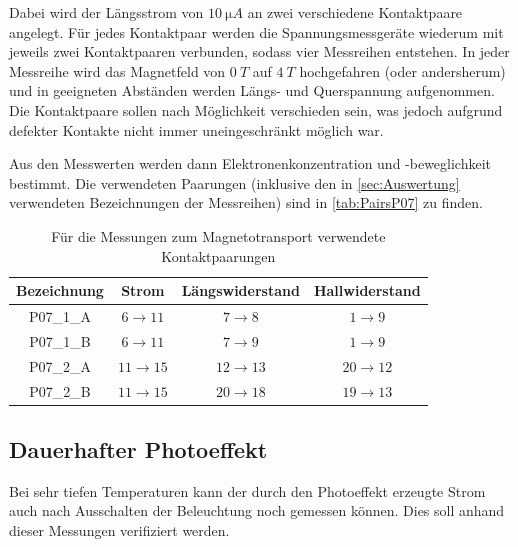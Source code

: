 Dabei wird der Längsstrom von $10\ \si{\micro A}$ an zwei verschiedene Kontaktpaare angelegt.
Für jedes Kontaktpaar werden die Spannungsmessgeräte wiederum mit jeweils zwei Kontaktpaaren verbunden, sodass vier Messreihen entstehen.
In jeder Messreihe wird das Magnetfeld von $0\ \si{T}$ auf $4\ \si{T}$ hochgefahren (oder andersherum) und in geeigneten Abständen werden Längs- und Querspannung aufgenommen.
Die Kontaktpaare sollen nach Möglichkeit verschieden sein, was jedoch aufgrund defekter Kontakte nicht immer uneingeschränkt möglich war.

Aus den Messwerten werden dann Elektronenkonzentration und -beweglichkeit bestimmt.
Die verwendeten Paarungen (inklusive den in \autoref{sec:Auswertung} verwendeten Bezeichnungen der Messreihen) sind in \autoref{tab:PairsP07} zu finden.\\

\begin{table}[ht]
\caption{Für die Messungen zum Magnetotransport verwendete Kontaktpaarungen}
\label{tab:PairsP07}
\centering
\begin{tabular}{cccc}
\toprule
Bezeichnung & Strom & Längswiderstand & Hallwiderstand\\
\midrule
P07\_1\_A & $6\rightarrow 11$ & $7\rightarrow 8$ & $1\rightarrow 9$\\
P07\_1\_B & $6\rightarrow 11$ & $7\rightarrow 9$ & $1\rightarrow 9$\\
P07\_2\_A & $11\rightarrow 15$ & $12\rightarrow 13$ & $20\rightarrow 12$\\
P07\_2\_B & $11\rightarrow 15$ & $20\rightarrow 18$ & $19\rightarrow 13$\\
\bottomrule
\end{tabular}
\end{table}

\subsection{Dauerhafter Photoeffekt}\label{sec:Photoeffekt}
Bei sehr tiefen Temperaturen kann der durch den Photoeffekt erzeugte Strom auch nach Ausschalten der Beleuchtung noch gemessen können.
Dies soll anhand dieser Messungen verifiziert werden.

